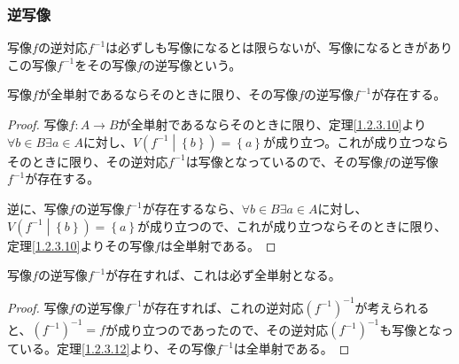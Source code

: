 \documentclass[dvipdfmx]{jsarticle}
\begin{document}
\subsubsection{逆写像}%
\begin{dfn}
写像$f$の逆対応$f^{- 1}$は必ずしも写像になるとは限らないが、写像になるときがありこの写像$f^{- 1}$をその写像$f$の逆写像という。
\end{dfn}
\begin{thm}
\label{1.2.3.12}
写像$f$が全単射であるならそのときに限り、その写像$f$の逆写像$f^{- 1}$が存在する。
\end{thm}
\begin{proof}
写像$f:A \rightarrow B$が全単射であるならそのときに限り、定理\ref{1.2.3.10}より$\forall b \in B\exists a \in A$に対し、$V\left( f^{- 1} \middle| \left\{ b \right\} \right) = \left\{ a \right\}$が成り立つ。これが成り立つならそのときに限り、その逆対応$f^{- 1}$は写像となっているので、その写像$f$の逆写像$f^{- 1}$が存在する。\par
逆に、写像$f$の逆写像$f^{- 1}$が存在するなら、$\forall b \in B\exists a \in A$に対し、$V\left( f^{- 1} \middle| \left\{ b \right\} \right) = \left\{ a \right\}$が成り立つので、これが成り立つならそのときに限り、定理\ref{1.2.3.10}よりその写像$f$は全単射である。
\end{proof}
\begin{thm}
\label{1.2.3.13}
写像$f$の逆写像$f^{- 1}$が存在すれば、これは必ず全単射となる。
\end{thm}
\begin{proof}
写像$f$の逆写像$f^{- 1}$が存在すれば、これの逆対応$\left( f^{- 1} \right)^{- 1}$が考えられると、$\left( f^{- 1} \right)^{- 1} = f$が成り立つのであったので、その逆対応$\left( f^{- 1} \right)^{- 1}$も写像となっている。定理\ref{1.2.3.12}より、その写像$f^{- 1}$は全単射である。
\end{proof}
\end{document}
